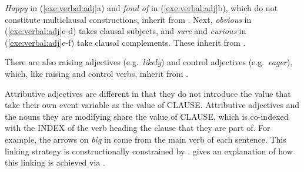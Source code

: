 \noindent \textit{Happy} in (\ref{exe:verbal:adj}a) and \textit{fond
  of} in (\ref{exe:verbal:adj}b), which do not
constitute multiclausal constructions, inherit from
. Next, \textit{obvious} in
(\ref{exe:verbal:adj}c-d) takes clausal subjects, and \textit{sure}
and \textit{curious} in (\ref{exe:verbal:adj}e-f) take clausal
complements. These inherit from .





\noindent There are also raising adjectives (e.g.\ \textit{likely})
and control adjectives (e.g.\ \textit{eager}), which, like raising and
control verbs, inherit from .



Attributive adjectives are different in that they do not introduce the
 value that take their own event variable as the value
of CLAUSE.  Attributive adjectives and the nouns they are modifying
share the value of CLAUSE, which is co-indexed with the
INDEX of the verb heading the clause that they are part of.  For
example, the arrows on \textit{big} in  come
from the main verb of each sentence.  This linking strategy is
constructionally constrained by
.  gives an explanation
of how this linking is achieved via .










